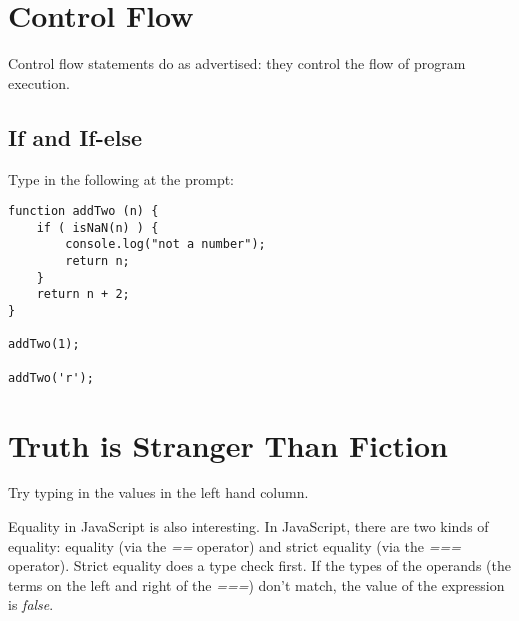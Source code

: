 \documentclass{article}
\begin{document}
\section{Control Flow}
Control flow statements do as advertised: they control the flow of program execution.
\subsection{If and If-else}
Type in the following at the prompt:

\begin{lstlisting}
function addTwo (n) {
    if ( isNaN(n) ) {
        console.log("not a number");
        return n;
    }
    return n + 2;
}

addTwo(1);

addTwo('r');
\end{lstlisting}

\section{Truth is Stranger Than Fiction}
Try typing in the values in the left hand column.


Equality in JavaScript is also interesting. In JavaScript, there are two kinds of equality: equality (via the \emph{==} operator) and strict equality (via the \emph{===} operator). Strict equality does a type check first. If the types of the operands (the terms on the left and right of the \emph{===}) don't match, the value of the expression is \emph{false}.
\end{document}
